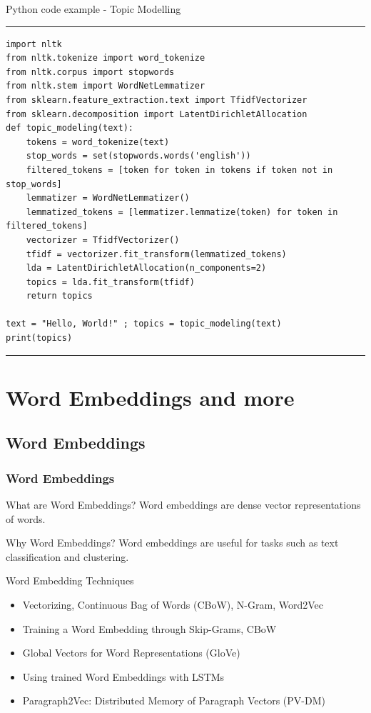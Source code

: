 \documentclass[aspectratio=169, hideothersubsections]{beamer}
\begin{document}
\begin{frame}[fragile]{Python code example - Topic Modelling}
\rule{\textwidth}{1pt}
\scriptsize
\begin{verbatim}
import nltk
from nltk.tokenize import word_tokenize
from nltk.corpus import stopwords
from nltk.stem import WordNetLemmatizer
from sklearn.feature_extraction.text import TfidfVectorizer
from sklearn.decomposition import LatentDirichletAllocation
def topic_modeling(text):
    tokens = word_tokenize(text)
    stop_words = set(stopwords.words('english'))
    filtered_tokens = [token for token in tokens if token not in stop_words]
    lemmatizer = WordNetLemmatizer()
    lemmatized_tokens = [lemmatizer.lemmatize(token) for token in filtered_tokens]
    vectorizer = TfidfVectorizer()
    tfidf = vectorizer.fit_transform(lemmatized_tokens)
    lda = LatentDirichletAllocation(n_components=2)
    topics = lda.fit_transform(tfidf)
    return topics

text = "Hello, World!" ; topics = topic_modeling(text)
print(topics)
\end{verbatim}
\rule{\textwidth}{1pt}
\end{frame}

\section{Word Embeddings and more}

\subsection{Word Embeddings}

\begin{frame}
  \frametitle{Word Embeddings}
  \begin{block}{What are Word Embeddings?}
    Word embeddings are dense vector representations of words.
  \end{block}
  \begin{block}{Why Word Embeddings?}
    Word embeddings are useful for tasks such as text classification and clustering.
  \end{block}
\begin{block}{Word Embedding Techniques}
    \begin{itemize}
    \item Vectorizing, Continuous Bag of Words (CBoW), N-Gram, Word2Vec
    \item Training a Word Embedding through Skip-Grams, CBoW
    \item Global Vectors for Word Representations (GloVe)
    \item Using trained Word Embeddings with LSTMs
    \item Paragraph2Vec: Distributed Memory of Paragraph Vectors (PV-DM)
  \end{itemize}
\end{block}
\end{frame}
\end{document}
